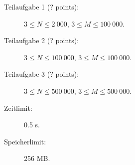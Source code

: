 \documentclass{boi2014-de}
\begin{document}
    \Scoring

    \begin{description}
        \item[Teilaufgabe 1 (? points):] $3 \le N \le 2\ 000$, $3 \le M \le 100\ 000$.
        \item[Teilaufgabe 2 (? points):] $3 \le N \le 100\ 000$, $3 \le M \le 100\ 000$.
        \item[Teilaufgabe 3 (? points):] $3 \le N \le 500\ 000$, $3 \le M \le 500\ 000$.
    \end{description}

    \Constraints

    \begin{description}
        \item[Zeitlimit:] 0.5 s.
        \item[Speicherlimit:] 256 MB.
    \end{description}
\end{document}
